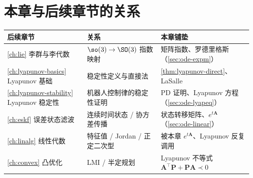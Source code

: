 \section*{本章与后续章节的关系}
\begin{table}[H]\centering\small
\begin{tabular}{lll}
\toprule
后续章节 & 关系 & 本章铺垫 \\
\midrule
\cref{ch:lie} 李群与李代数 & $\so(3)\to\SO(3)$ 指数映射 & 矩阵指数、罗德里格斯（\cref{sec:ode-expm}）\\
\cref{ch:lyapunov-basics} Lyapunov 基础 & 稳定性定义与直接法 & \cref{thm:lyapunov-direct}、LaSalle \\
\cref{ch:lyapunov-stability} Lyapunov 稳定性 & 机器人控制律的稳定性证明 & PD 证明、Lyapunov 方程（\cref{sec:ode-lyapeq}）\\
\cref{ch:eskf} 误差状态滤波 & 连续时间状态 / 协方差传播 & 状态转移矩阵、$e^{t\mathbf{A}}$（\cref{sec:ode-linear}）\\
\cref{ch:linalg} 线性代数 & 特征值 / Jordan / 正定二次型 & 被本章 $e^{t\mathbf{A}}$、Lyapunov 反复调用 \\
\cref{ch:convex} 凸优化 & LMI / 半定规划 & Lyapunov 不等式 $\mathbf{A}^\top\mathbf{P}+\mathbf{P}\mathbf{A}\prec0$ \\
\bottomrule
\end{tabular}
\end{table}

